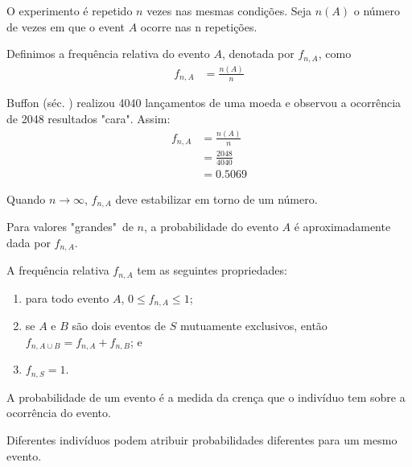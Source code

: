 \begin{definition}
    O experimento é repetido $n$ vezes nas mesmas condições.
    Seja $n(A)$ o número de vezes em que o event $A$ ocorre
    nas n repetições.

    Definimos a frequência relativa do evento $A$, denotada
    por $f_{n, A}$, como
    \begin{align}
        f_{n, A} &= \frac{n(A)}{n} \label{eq:ch01-def-frequentista}
    \end{align}
\end{definition}

\begin{example}
    Buffon (séc. ) realizou 4040 lançamentos de uma moeda
    e observou a ocorrência de 2048 resultados "cara". Assim:
    \begin{align*}
        f_{n, A} &= \frac{n(A)}{n} \\
        &= \frac{2048}{4040} \\
        &= 0.5069
    \end{align*}
\end{example}

Quando $n \to \infty$, $f_{n, A}$ deve estabilizar em torno de
um número.

Para valores "grandes"\ de $n$, a probabilidade do evento $A$ é
aproximadamente dada por $f_{n, A}$.

\begin{lemma}
    A frequência relativa $f_{n, A}$ tem as seguintes propriedades:
    \begin{enumerate}
        \item para todo evento $A$, $0 \leq f_{n, A} \leq 1$;
        \item se $A$ e $B$ são dois eventos de $S$ mutuamente exclusivos,
            então $f_{n, A \cup B} = f_{n,A} + f_{n,B}$; e
        \item $f_{n,S} = 1$.
    \end{enumerate}
\end{lemma}

\begin{definition}
    A probabilidade de um evento é a medida da crença que o indivíduo
    tem sobre a ocorrência do evento.

    Diferentes indivíduos podem atribuir probabilidades diferentes
    para um mesmo evento.
\end{definition}

